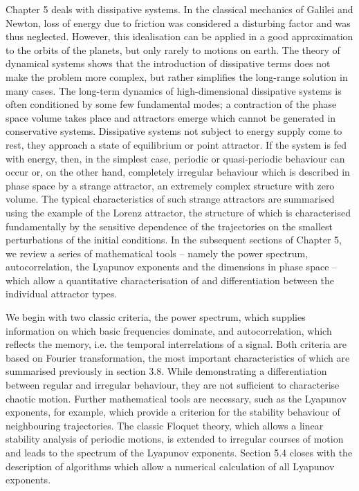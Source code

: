 \documentclass[12pt]{article}
\begin{document}
\hfill

Chapter 5 deals with dissipative systems. In the classical mechanics of Galilei and
Newton, loss of energy due to friction was considered a disturbing factor and was
thus neglected. However, this idealisation can be applied in a good approximation
to the orbits of the planets, but only rarely to motions on earth. The theory of
dynamical systems shows that the introduction of dissipative terms does not make
the problem more complex, but rather simplifies the long-range solution in many
cases. The long-term dynamics of high-dimensional dissipative systems is often conditioned
by some few fundamental modes; a contraction of the phase space volume
takes place and attractors emerge which cannot be generated in conservative systems.
Dissipative systems not subject to energy supply come to rest, they approach
a state of equilibrium or point attractor. If the system is fed with energy, then, in
the simplest case, periodic or quasi-periodic behaviour can occur or, on the other
hand, completely irregular behaviour which is described in phase space by a strange
attractor, an extremely complex structure with zero volume. The typical characteristics
of such strange attractors are summarised using the example of the Lorenz
attractor, the structure of which is characterised fundamentally by the sensitive
dependence of the trajectories on the smallest perturbations of the initial conditions.
In the subsequent sections of Chapter 5, we review a series of mathematical
tools – namely the power spectrum, autocorrelation, the Lyapunov exponents and
the dimensions in phase space – which allow a quantitative characterisation of and
differentiation between the individual attractor types.

\hfill

We begin with two classic criteria, the power spectrum, which supplies information
on which basic frequencies dominate, and autocorrelation, which reflects the memory,
i.e. the temporal interrelations of a signal. Both criteria are based on Fourier
transformation, the most important characteristics of which are summarised previously
in section 3.8. While demonstrating a differentiation between regular and
irregular behaviour, they are not sufficient to characterise chaotic motion. Further
mathematical tools are necessary, such as the Lyapunov exponents, for example,
which provide a criterion for the stability behaviour of neighbouring trajectories.
The classic Floquet theory, which allows a linear stability analysis of periodic motions,
is extended to irregular courses of motion and leads to the spectrum of the
Lyapunov exponents. Section 5.4 closes with the description of algorithms which
allow a numerical calculation of all Lyapunov exponents.
\end{document}

